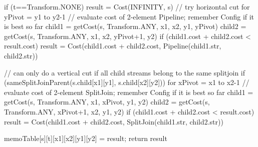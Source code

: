   if (t==Transform.NONE)
    result = Cost(INFINITY, s)
    // try horizontal cut
    for yPivot = y1 to y2-1
      // evaluate cost of 2-element Pipeline; remember Config if it is best so far
      child1 = getCost(s, Transform.ANY, x1, x2, y1, yPivot)
      child2 = getCost(s, Transform.ANY, x1, x2, yPivot+1, y2)
      if (child1.cost + child2.cost < result.cost)
        result = Cost(child1.cost + child2.cost, Pipeline(child1.str, child2.str))

    // can only do a vertical cut if all child streams belong to the same splitjoin
    if (sameSplitJoinParent(s.child[x1][y1], s.child[x2][y2]))
      for xPivot = x1 to x2-1
        // evaluate cost of 2-element SplitJoin; remember Config if it is best so far
        child1 = getCost(s, Transform.ANY, x1, xPivot, y1, y2)
        child2 = getCost(s, Transform.ANY, xPivot+1, x2, y1, y2)
        if (child1.cost + child2.cost < result.cost)
          result = Cost(child1.cost + child2.cost, SplitJoin(child1.str, child2.str))

  memoTable[s][t][x1][x2][y1][y2] = result;
  return result
